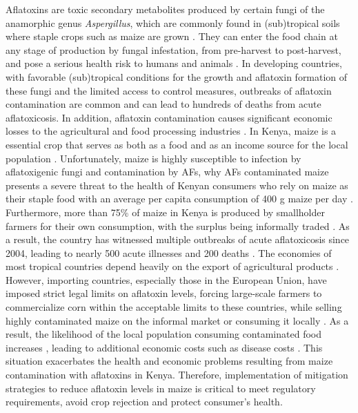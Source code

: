 \begin{refsection}
Aflatoxins are toxic secondary metabolites produced by certain fungi of the anamorphic genus \textit{Aspergillus}, which are commonly found in (sub)tropical soils where staple crops such as maize are grown \citep{mahuku2019pre}. They can enter the food chain at any stage of production by fungal infestation, from pre-harvest to post-harvest, and pose a serious health risk to humans and animals \citep{winter2019review}. In developing countries, with favorable (sub)tropical conditions for the growth and aflatoxin formation of these fungi and the limited access to control measures, outbreaks of aflatoxin contamination are common and can lead to hundreds of deaths from acute aflatoxicosis. In addition, aflatoxin contamination causes significant economic losses to the agricultural and food processing industries \citep{winter2019review}. In Kenya, maize is a essential crop that serves as both as a food and as an income source for the local population \citep{mahuku2019pre}. Unfortunately, maize is highly susceptible to infection by aflatoxigenic fungi and contamination by AFs, why AFs contaminated maize presents a severe threat to the health of Kenyan consumers who rely on maize as their staple food  with an average per capita consumption of 400 g maize per day \citep{lewis2005aflatoxin}. Furthermore, more than 75\% of maize in Kenya is produced by smallholder farmers for their own consumption, with the surplus being informally traded \citep{mahuku2019pre}. As a result, the country has witnessed multiple outbreaks of acute aflatoxicosis since 2004, leading to nearly 500 acute illnesses and 200 deaths \citep{lewis2005aflatoxin}. The economies of most tropical countries depend heavily on the export of agricultural products \citep{matumba2015concentrating}. However, importing countries, especially those in the European Union, have imposed strict legal limits on aflatoxin levels, forcing large-scale farmers to commercialize corn within the acceptable limits to these countries, while selling highly contaminated maize on the informal market or consuming it locally \citep{matumba2015concentrating, nji2022six}. As a result, the likelihood of the local population consuming contaminated food increases \citep{nji2022six, udomkun2017mycotoxins}, leading to additional economic costs such as disease costs \citep{meijer2021aflatoxin}. This situation exacerbates the health and economic problems resulting from maize contamination with aflatoxins in Kenya. Therefore, implementation of mitigation strategies to reduce aflatoxin levels in maize is critical to meet regulatory requirements, avoid crop rejection and protect consumer's health.



\end{refsection}
